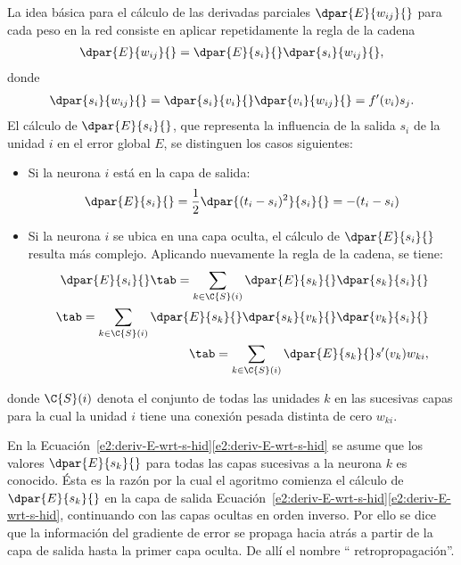 La idea básica para el cálculo de las derivadas parciales
$\dpar{E}{w_{ij}}{}$ para cada peso en la red consiste en aplicar
repetidamente la regla de la cadena
%
\begin{align}\label{e2:deriv-E-wrt-w}
  \dpar{E}{w_{ij}}{} = \dpar{E}{s_{i}}{}\dpar{s_i}{w_{ij}}{},
\end{align}
%
donde
%
\begin{align}\label{e2:deriv-s-wrt-w}
  \dpar{s_i}{w_{ij}}{} = \dpar{s_i}{v_{i}}{}\dpar{v_i}{w_{ij}}{} =
  f'(v_i) s_j .
\end{align}
%
El cálculo de $\dpar{E}{s_i}{}$, que representa la influencia
de la salida $s_i$ de la unidad $i$ en el error global $E$,
se distinguen los casos siguientes:
%
\begin{itemize}
\item Si la neurona $i$ está en la capa de salida:
  \begin{align}\label{e2:deriv-E-wrt-s-out} %
    \dpar{E}{s_i}{}=\frac{1}{2}\dpar{(t_i-s_i)^2}{s_i}{}=-(t_i-s_i)
  \end{align}
\item Si la neurona $i$ se ubica en una capa oculta, el cálculo de
  $\dpar{E}{s_i}{}$ resulta más complejo. Aplicando nuevamente la
  regla de la cadena, se tiene:
  \begin{align}\label{e2:deriv-E-wrt-s-hid} %
    \dpar{E}{s_i}{} \tab= \sum_{k\in\C{S}(i)}
      \dpar{E}{s_k}{}\dpar{s_k}{s_i}{} \notag\\
    \tab= \sum_{k\in\C{S}(i)}
      \dpar{E}{s_k}{}\dpar{s_k}{v_k}{}\dpar{v_k}{s_i}{} \notag\\
    \tab= \sum_{k\in\C{S}(i)} \dpar{E}{s_k}{} s'(v_k) w_{ki},
  \end{align}
\end{itemize}
donde $\C{S}(i)$ denota el conjunto de todas las unidades $k$ en las
sucesivas capas para la cual la unidad $i$ tiene una conexión
pesada distinta de cero $w_{ki}$.

En la
\iflatexml{}Ecuación~\ref{e2:deriv-E-wrt-s-hid}\else\autoref{e2:deriv-E-wrt-s-hid}\endif
se asume que los valores $\dpar{E}{s_k}{}$ para todas las capas
sucesivas a la neurona $k$ es conocido. Ésta es la razón por la cual
el agoritmo comienza el cálculo de $\dpar{E}{s_k}{}$ en la capa de
salida
\iflatexml{}Ecuación~\ref{e2:deriv-E-wrt-s-hid}\else\autoref{e2:deriv-E-wrt-s-hid}\endif,
continuando con las capas ocultas en orden inverso.
Por ello se dice que la información del gradiente de error se propaga hacia atrás
a partir de la capa de salida hasta la primer capa
oculta. De allí el nombre `` retropropagación''.

